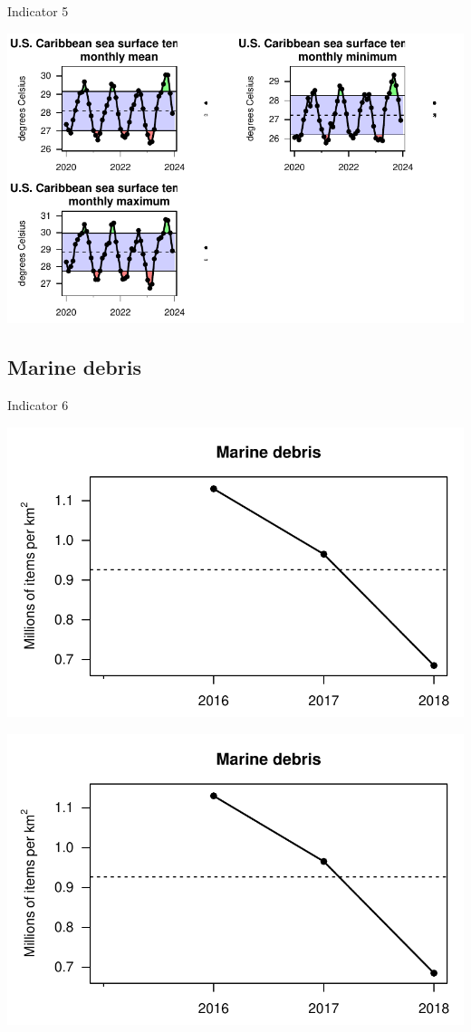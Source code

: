 \documentclass[
  letterpaper,
  oneside,
  open=any]{scrbook}
\begin{document}
Indicator 5

\includegraphics{Report_book_files/Risk_indicators_files/figure-pdf/unnamed-chunk-6-1.pdf}

\subsection{Marine debris}\label{marine-debris}

Indicator 6

\includegraphics{Report_book_files/Risk_indicators_files/figure-pdf/unnamed-chunk-7-1.pdf}

\includegraphics{Report_book_files/Risk_indicators_files/figure-pdf/unnamed-chunk-8-1.pdf}
\end{document}

